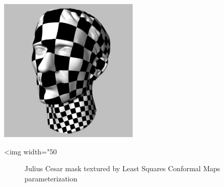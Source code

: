 \begin{center}
    \label{Surface_mesh_parameterization-fig-introduction}
    \begin{ccTexOnly}
        \includegraphics[width=0.5\textwidth]{Surface_mesh_parameterization/introduction} %
    \end{ccTexOnly}
    \begin{ccHtmlOnly}
        <img width="50%
    \end{ccHtmlOnly}
    \begin{figure}[h]
        \caption{Julius Cesar mask textured by Least Squares Conformal Maps parameterization}
    \end{figure}
\end{center}


